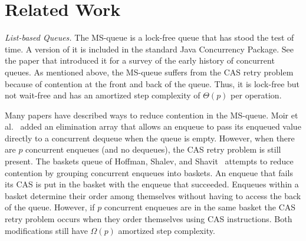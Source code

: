 
\section{Related Work}

\emph{List-based Queues.}
The MS-queue \cite{MS98} is a lock-free queue that has stood the test of time.
A version of it is
included in the standard Java Concurrency Package.  %
See the paper that introduced it for a survey of the early history of concurrent queues.
As mentioned above, the MS-queue suffers from the CAS retry problem because of contention at the front and back of the queue.
Thus, it is lock-free but not wait-free and has an amortized step complexity of $\Theta(p)$ per operation.


Many papers have described ways to reduce contention in the MS-queue.
Moir et al.~\cite{DBLP:conf/spaa/MoirNSS05} 
added an elimination array that allows an enqueue to pass its enqueued value directly
to a concurrent dequeue when the queue is empty.
However, when there are $p$ concurrent enqueues (and no dequeues), the CAS retry problem
is still present.
The baskets queue of
Hoffman, Shalev, and Shavit~\cite{DBLP:conf/opodis/HoffmanSS07} 
attempts to reduce contention by grouping concurrent enqueues into baskets.
An enqueue that fails its CAS is put in the basket with the enqueue that succeeded.
Enqueues within a basket determine their order among themselves without having to access the back of the queue.
However, if $p$ concurrent enqueues are in the same basket
the CAS retry problem occurs when they order themselves using CAS instructions.
Both modifications still have $\Omega(p)$ amortized step complexity.

